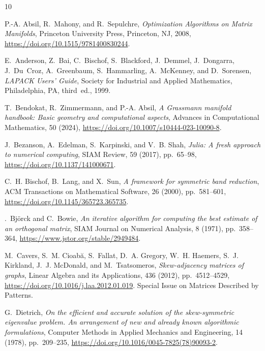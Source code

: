 \documentclass[final,onefignum,onetabnum,dvipsnames]{siamart251216}
\numberwithin{algorithm}{section}
\numberwithin{equation}{section}
\begin{document}
\newpage
\begin{thebibliography}{10}

{\sc P.-A. Absil, R.~Mahony, and R.~Sepulchre}, {\em Optimization Algorithms on Matrix Manifolds}, Princeton University Press, Princeton, NJ, 2008, \url{https://doi.org/10.1515/9781400830244}.

{\sc E.~Anderson, Z.~Bai, C.~Bischof, S.~Blackford, J.~Demmel, J.~Dongarra, J.~Du~Croz, A.~Greenbaum, S.~Hammarling, A.~McKenney, and D.~Sorensen}, {\em {LAPACK} Users' Guide}, Society for Industrial and Applied Mathematics, Philadelphia, PA, third~ed., 1999.

{\sc T.~Bendokat, R.~Zimmermann, and P.-A. Absil}, {\em A {G}rassmann manifold handbook: Basic geometry and computational aspects}, Advances in Computational Mathematics, 50 (2024), \url{https://doi.org/10.1007/s10444-023-10090-8}.

{\sc J.~Bezanson, A.~Edelman, S.~Karpinski, and V.~B. Shah}, {\em Julia: A fresh approach to numerical computing}, SIAM {R}eview, 59 (2017), pp.~65--98, \url{https://doi.org/10.1137/141000671}.

{\sc C.~H. Bischof, B.~Lang, and X.~Sun}, {\em A framework for symmetric band reduction}, ACM Transactions on Mathematical Software, 26 (2000), pp.~581--601, \url{https://doi.org/10.1145/365723.365735}.

{\sc {\AA}.~Bj{\"o}rck and C.~Bowie}, {\em An iterative algorithm for computing the best estimate of an orthogonal matrix}, SIAM Journal on Numerical Analysis, 8 (1971), pp.~358--364, \url{https://www.jstor.org/stable/2949484}.

{\sc M.~Cavers, S.~M. Cioab{\u{a}}, S.~Fallat, D.~A. Gregory, W.~H. Haemers, S.~J. Kirkland, J.~J. McDonald, and M.~Tsatsomeros}, {\em Skew-adjacency matrices of graphs}, Linear Algebra and its Applications, 436 (2012), pp.~4512--4529, \url{https://doi.org/10.1016/j.laa.2012.01.019}.
\newblock Special Issue on Matrices Described by Patterns.

{\sc G.~Dietrich}, {\em On the efficient and accurate solution of the skew-symmetric eigenvalue problem. {A}n arrangement of new and already known algorithmic formulations}, Computer Methods in Applied Mechanics and Engineering, 14 (1978), pp.~209--235, \url{https://doi.org/10.1016/0045-7825(78)90093-2}.


\end{thebibliography}
\end{document}
